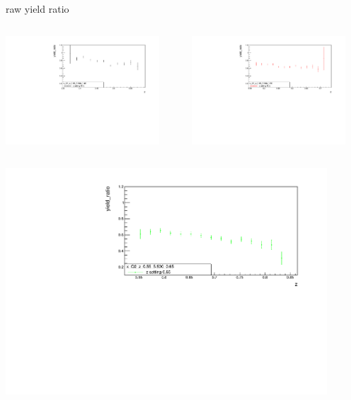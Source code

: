 \begin{frame}{raw yield ratio}
\begin{columns}
\begin{column}[T]{0.5\textwidth}
\includegraphics[width = 0.9\textwidth]{results/yield/statistics/x_Q2_z_0.55_5.500_0.45_ratio.pdf}
\end{column}
\begin{column}[T]{0.5\textwidth}
\includegraphics[width = 0.9\textwidth]{results/yield/statistics/x_Q2_z_0.55_5.500_0.55_ratio.pdf}
\end{column}
\end{columns}
\begin{columns}
\begin{column}[T]{0.5\textwidth}
\includegraphics[width = 0.9\textwidth]{results/yield/statistics/x_Q2_z_0.55_5.500_0.65_ratio.pdf}

\end{column}
\end{columns}
\end{frame}
